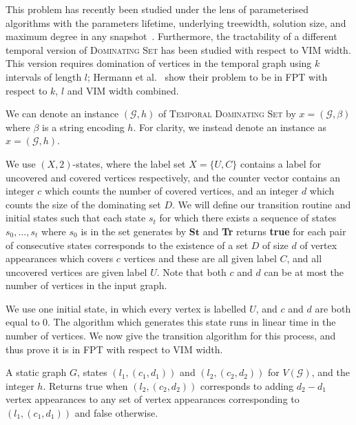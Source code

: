 \documentclass[a4paper,UKenglish,cleveref, autoref, thm-restate]{lipics-v2021} %
\begin{document}
\begin{toappendix}
This problem has recently been studied under the lens of parameterised algorithms with the parameters lifetime, underlying treewidth, solution size, and maximum degree in any snapshot~\cite{herrmann2025temporal}. Furthermore, the tractability of a different temporal version of \textsc{Dominating Set} has been studied with respect to VIM width. This version requires domination of vertices in the temporal graph using $k$ intervals of length $l$; Hermann et al.~\cite{herrmann2025timeline} show their problem to be in FPT with respect to $k$, $l$ and VIM width combined.

We can denote an instance $(\mathcal{G},h)$ of \textsc{Temporal Dominating Set} by $x=(\mathcal{G},\beta)$ where $\beta$ is a string encoding $h$. For clarity, we instead denote an instance as $x=(\mathcal{G},h)$.

We use $(X,2)$-states, where the label set $X=\{U, C\}$ contains a label for uncovered and covered vertices respectively, and the counter vector contains an integer $c$ which counts the number of covered vertices, and an integer $d$ which counts the size of the dominating set $D$. We will define our transition routine and initial states such that each state $s_t$ for which there exists a sequence of states $s_0,\ldots,s_t$ where $s_0$ is in the set generates by $\textbf{St}$ and \textbf{Tr} returns \textbf{true} for each pair of consecutive states corresponds to the existence of a set $D$ of size $d$ of vertex appearances which covers $c$ vertices and these are all given label $C$, and all uncovered vertices are given label $U$. Note that both $c$ and $d$ can be at most the number of vertices in the input graph.

We use one initial state, in which every vertex is labelled $U$, and $c$ and $d$ are both equal to $0$. The algorithm which generates this state runs in linear time in the number of vertices. We now give the transition algorithm for this process, and thus prove it is in FPT with respect to VIM width.

 \begin{algorithm}\caption{\textsc{Temporal Dominating Set Transition}}\label{alg:temp-dom}
     \begin{algorithmic}[1]
     \Require A static graph $G$, states $(l_1, (c_1, d_1))$ and $(l_2, (c_2, d_2))$ for $V(\mathcal{G})$, and the integer $h$.
     \Ensure Returns true when $(l_2, (c_2, d_2))$ corresponds to adding $d_2-d_1$ vertex appearances to any set of vertex appearances corresponding to $(l_1, (c_1, d_1))$ and false otherwise.
     \Else
     \EndIf
     \end{algorithmic}
 \end{algorithm}


\end{toappendix}
\end{document}
